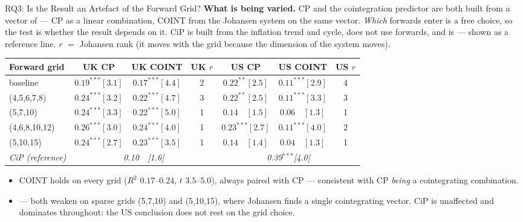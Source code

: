 \begin{frame}[t]{RQ3: Is the Result an Artefact of the Forward Grid?}
\vspace{0.05cm}
\scriptsize
\textbf{What is being varied.} CP and the cointegration predictor are both built from a vector
of  --- CP as a linear combination, COINT from the Johansen system on
the same vector. \emph{Which} forwards enter is a free choice, so the test is whether the
result depends on it. CiP is built from the inflation trend and cycle, does not use forwards,
and is  --- shown as a reference line. $r$ $=$ Johansen rank
(it moves with the grid because the dimension of the system moves).

\vspace{0.18cm}
\centering
\begin{tabular}{lcccccc}
\toprule
Forward grid & UK CP & UK COINT & UK $r$ & US CP & US COINT & US $r$ \\
\midrule
baseline           & $0.19^{***}[3.1]$ & $0.17^{***}[4.4]$ & 2 & $0.22^{**}[2.5]$ & $0.11^{***}[2.9]$ & 4 \\
(4,5,6,7,8)        & $0.24^{***}[3.2]$ & $0.22^{***}[4.7]$ & 3 & $0.22^{**}[2.5]$ & $0.11^{***}[3.3]$ & 3 \\
(5,7,10)           & $0.24^{***}[3.3]$ & $0.22^{***}[5.0]$ & 1 & $0.14\phantom{^{**}}[1.5]$ & $0.06\phantom{^{**}}[1.3]$ & 1 \\
(4,6,8,10,12)      & $0.26^{***}[3.0]$ & $0.24^{***}[4.0]$ & 1 & $0.23^{***}[2.7]$ & $0.11^{***}[4.0]$ & 2 \\
(5,10,15)          & $0.24^{***}[2.7]$ & $0.23^{***}[3.5]$ & 1 & $0.14\phantom{^{**}}[1.4]$ & $0.04\phantom{^{**}}[1.3]$ & 1 \\
\midrule
\textit{CiP (reference)} & \multicolumn{3}{c}{\textit{0.10\ \ [1.6]}} & \multicolumn{3}{c}{\textit{0.39$^{***}$[4.0]}} \\
\bottomrule
\end{tabular}

\vspace{0.25cm}
\raggedright\footnotesize
\begin{itemize}\itemsep=0.08cm\footnotesize
  \item {} COINT holds on every grid ($R^2$ $0.17$--$0.24$, $t$
        $3.5$--$5.0$), always paired with CP --- consistent with CP \emph{being} a
        cointegrating combination.
  \item {} --- both weaken on sparse
        grids (5,7,10) and (5,10,15), where Johansen finds a single cointegrating vector.
        CiP is unaffected and dominates throughout: the US conclusion does not rest on the
        grid choice.
\end{itemize}
\end{frame}

